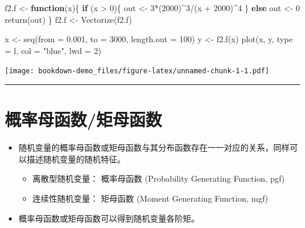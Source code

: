 \documentclass[
]{book}
\newenvironment{Shaded}{\begin{snugshade}}{\end{snugshade}}
\newcommand{\AttributeTok}[1]{\textcolor[rgb]{0.77,0.63,0.00}{#1}}
\newcommand{\ControlFlowTok}[1]{\textcolor[rgb]{0.13,0.29,0.53}{\textbf{#1}}}
\newcommand{\DecValTok}[1]{\textcolor[rgb]{0.00,0.00,0.81}{#1}}
\newcommand{\FloatTok}[1]{\textcolor[rgb]{0.00,0.00,0.81}{#1}}
\newcommand{\FunctionTok}[1]{\textcolor[rgb]{0.00,0.00,0.00}{#1}}
\newcommand{\NormalTok}[1]{#1}
\newcommand{\OtherTok}[1]{\textcolor[rgb]{0.56,0.35,0.01}{#1}}
\newcommand{\SpecialCharTok}[1]{\textcolor[rgb]{0.00,0.00,0.00}{#1}}
\newcommand{\StringTok}[1]{\textcolor[rgb]{0.31,0.60,0.02}{#1}}
\begin{document}
\begin{Shaded}
\begin{Highlighting}[]
\NormalTok{f2.f }\OtherTok{\textless{}{-}} \ControlFlowTok{function}\NormalTok{(x)\{}
  \ControlFlowTok{if}\NormalTok{ (x }\SpecialCharTok{\textgreater{}} \DecValTok{0}\NormalTok{)\{}
\NormalTok{    out }\OtherTok{\textless{}{-}} \DecValTok{3}\SpecialCharTok{*}\NormalTok{(}\DecValTok{2000}\NormalTok{)}\SpecialCharTok{\^{}}\DecValTok{3}\SpecialCharTok{/}\NormalTok{(x }\SpecialCharTok{+} \DecValTok{2000}\NormalTok{)}\SpecialCharTok{\^{}}\DecValTok{4}
\NormalTok{  \} }\ControlFlowTok{else}\NormalTok{ out }\OtherTok{\textless{}{-}} \DecValTok{0}
  \FunctionTok{return}\NormalTok{(out)}
\NormalTok{\}}
\NormalTok{f2.f }\OtherTok{\textless{}{-}} \FunctionTok{Vectorize}\NormalTok{(f2.f)}

\NormalTok{x }\OtherTok{\textless{}{-}} \FunctionTok{seq}\NormalTok{(}\AttributeTok{from =} \FloatTok{0.001}\NormalTok{, }\AttributeTok{to =} \DecValTok{3000}\NormalTok{, }\AttributeTok{length.out =} \DecValTok{100}\NormalTok{)}
\NormalTok{y }\OtherTok{\textless{}{-}} \FunctionTok{f2.f}\NormalTok{(x)}
\FunctionTok{plot}\NormalTok{(x, y, }\AttributeTok{type =} \StringTok{\textquotesingle{}l\textquotesingle{}}\NormalTok{, }\AttributeTok{col =} \StringTok{"blue"}\NormalTok{, }\AttributeTok{lwd =} \DecValTok{2}\NormalTok{)}
\end{Highlighting}
\end{Shaded}

\texttt{[image: bookdown-demo\_files/figure-latex/unnamed-chunk-1-1.pdf]}

\begin{center}\rule{0.5\linewidth}{0.5pt}\end{center}

\hypertarget{ux6982ux7387ux6bcdux51fdux6570ux77e9ux6bcdux51fdux6570}{%
\section{概率母函数/矩母函数}\label{ux6982ux7387ux6bcdux51fdux6570ux77e9ux6bcdux51fdux6570}}

\begin{itemize}
\item
  随机变量的概率母函数或矩母函数与其分布函数存在一一对应的关系，同样可以描述随机变量的随机特征。

  \begin{itemize}
  \item
    离散型随机变量： 概率母函数 (Probability Generating Function, pgf)
  \item
    连续性随机变量： 矩母函数 (Moment Generating Function, mgf)
  \end{itemize}
\item
  概率母函数或矩母函数可以得到随机变量各阶矩。
\end{itemize}
\end{document}
